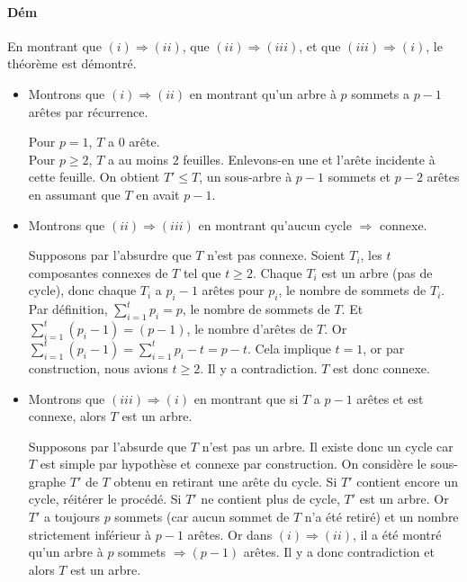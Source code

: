 \documentclass{article}
\begin{document}
			\paragraph{Dém} En montrant que $(i) \Rightarrow (ii)$, que $(ii) \Rightarrow (iii)$, et que $(iii) \Rightarrow (i)$, le théorème est démontré.
				\begin{itemize}
					\item Montrons que $(i) \Rightarrow (ii)$ en montrant qu'un arbre à $p$ sommets a $p-1$ arêtes par récurrence.

						  Pour $p = 1$, $T$ a $0$ arête. \\
						  Pour $p \geq 2$, $T$ a au moins $2$ feuilles. Enlevons-en une et l'arête incidente à cette feuille. On obtient $T' \leq T$, un sous-arbre
						  à $p-1$ sommets et $p-2$ arêtes en assumant que $T$ en avait $p-1$.

					\item Montrons que $(ii) \Rightarrow (iii)$ en montrant qu'aucun cycle $\Rightarrow$ connexe.

						  Supposons par l'absurdre que $T$ n'est pas connexe. Soient $T_i$, les $t$ composantes connexes de $T$ tel que $t \geq 2$. Chaque $T_i$
						  est un arbre (pas de cycle), donc chaque $T_i$ a $p_i - 1$ arêtes pour $p_i$, le nombre de sommets de $T_i$. Par définition,
						  $\sum_{i=1}^tp_i = p$, le nombre de sommets de $T$. Et $\sum_{i=1}^t(p_i-1) = (p-1)$, le nombre d'arêtes de $T$. Or
						  $\sum_{i=1}^t(p_i - 1) = \sum_{i=1}^tp_i - t = p - t$. Cela implique $t = 1$, or par construction, nous avions $t \geq 2$. Il
						  y a contradiction. $T$ est donc connexe.

					\item Montrons que $(iii) \Rightarrow (i)$ en montrant que si $T$ a $p-1$ arêtes et est connexe, alors $T$ est un arbre.

						  Supposons par l'absurde que $T$ n'est pas un arbre. Il existe donc un cycle car $T$ est simple par hypothèse et connexe par construction.
						  On considère le sous-graphe $T'$ de $T$ obtenu en retirant une arête du cycle. Si $T'$ contient encore un cycle, réitérer le procédé.
						  Si $T'$ ne contient plus de cycle, $T'$ est un arbre. Or $T'$ a toujours $p$ sommets (car aucun sommet de $T$ n'a été retiré) et un nombre
						  strictement inférieur à $p-1$ arêtes. Or dans $(i) \Rightarrow (ii)$, il a été montré qu'un arbre à $p$ sommets $\Rightarrow (p-1)$ arêtes.
						  Il y a donc contradiction et alors $T$ est un arbre.
				\end{itemize}
\end{document}
